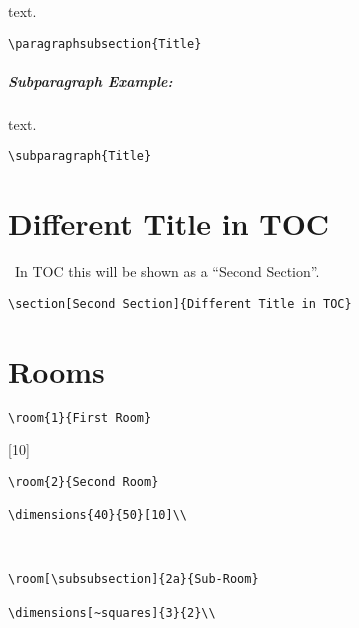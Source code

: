 \documentclass[itdr]{subfiles}
\begin{document}
 text. 

\begin{lstlisting}
\paragraphsubsection{Title}
\end{lstlisting}

\subparagraph{Subparagraph Example:} text. 

\noindent
\begin{lstlisting}
\subparagraph{Title}
\end{lstlisting}

\vfill

\section[Second Section]{Different Title in TOC}

\faHandPointUp~In TOC this will be shown as a ``Second Section''.

\begin{lstlisting}
\section[Second Section]{Different Title in TOC}
\end{lstlisting}

\break

\section{Rooms}


\lipsum[66]

\begin{lstlisting}
\room{1}{First Room}
\end{lstlisting}


[10]\\
\lipsum[66]

\begin{lstlisting}
\room{2}{Second Room}

\dimensions{40}{50}[10]\\
\end{lstlisting}


\\
\lipsum[66]

\begin{lstlisting}
\room[\subsubsection]{2a}{Sub-Room}

\dimensions[~squares]{3}{2}\\
\end{lstlisting}
\end{document}
